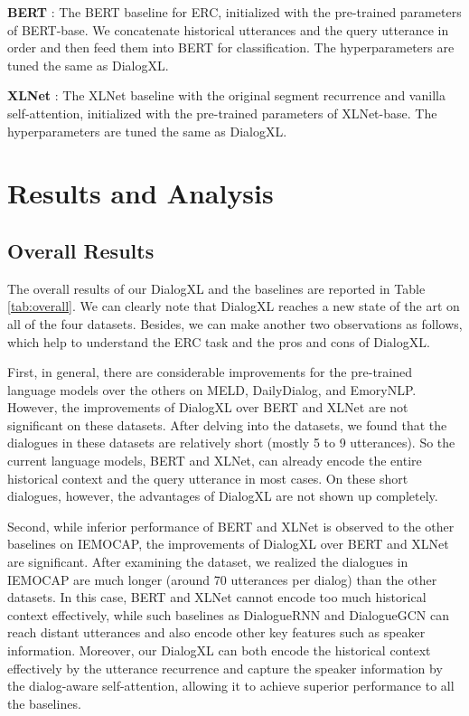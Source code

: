 \documentclass[letterpaper]{article} \usepackage{aaai21}  \usepackage{times}  \usepackage{helvet} \usepackage{courier}  \usepackage[hyphens]{url}  \usepackage{graphicx} \usepackage{amstext}
\begin{document}
\noindent\textbf{BERT} \cite{devlin2018bert}: The BERT baseline for ERC, initialized with the pre-trained parameters of BERT-base. We concatenate historical utterances and the query utterance in order and then feed them into BERT for classification. The hyperparameters are tuned the same as DialogXL. 

\noindent\textbf{XLNet} \cite{yang2019xlnet}: The XLNet baseline with the original segment recurrence and vanilla self-attention, initialized with the pre-trained parameters of XLNet-base. The hyperparameters are tuned the same as DialogXL. 



\section{Results and Analysis}

\subsection{Overall Results}
The overall results of our DialogXL and the baselines are reported in Table \ref{tab:overall}. We can clearly note that DialogXL reaches a new state of the art on all of the four datasets. Besides, we can make another two observations as follows, which help to understand the ERC task and the pros and cons of DialogXL.

First,  in general, there are considerable improvements for the pre-trained language models over the others on MELD, DailyDialog, and EmoryNLP. However, the improvements of DialogXL over BERT and XLNet are not significant on these datasets. After delving into the datasets, we found that the dialogues in these datasets are relatively short (mostly 5 to 9 utterances). So the current language models, BERT and XLNet, can already encode the entire historical context and the query utterance in most cases. On these short dialogues, however, the advantages of DialogXL are not shown up completely. 

Second, while inferior performance of BERT and XLNet is observed to the other baselines on IEMOCAP, the improvements of DialogXL over BERT and XLNet are significant. After examining the dataset, we realized the dialogues in IEMOCAP are much longer (around 70 utterances per dialog) than the other datasets. In this case, BERT and XLNet cannot encode too much historical context effectively, while such baselines as DialogueRNN and DialogueGCN can reach distant utterances and also encode other key features such as speaker information. Moreover, our DialogXL can both encode the historical context effectively by the utterance recurrence and 
capture the speaker information by the dialog-aware self-attention, allowing it to achieve superior performance to all the baselines.
\end{document}

